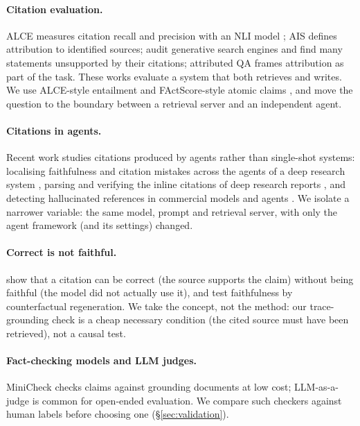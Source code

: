 \documentclass[11pt]{article}
\begin{document}
\paragraph{Citation evaluation.} ALCE \citep{gao2023alce} measures citation recall and precision
with an NLI model \citep{honovich2022true}; AIS \citep{rashkin2023ais} defines attribution to
identified sources; \citet{liu2023verifiability} audit generative search engines and find many
statements unsupported by their citations; attributed QA \citep{bohnet2022attributed} frames
attribution as part of the task. These works evaluate a system that both retrieves and writes.
We use ALCE-style entailment and FActScore-style atomic claims \citep{min2023factscore}, and move
the question to the boundary between a retrieval server and an independent agent.

\paragraph{Citations in agents.} Recent work studies citations produced by agents rather than
single-shot systems: localising faithfulness and citation mistakes across the agents of a deep
research system \citep{hirsch2026blame}, parsing and verifying the inline citations of deep
research reports \citep{onweller2026cited}, and detecting hallucinated references in commercial
models and agents \citep{rao2026reference}. We isolate a narrower variable: the same model, prompt
and retrieval server, with only the agent framework (and its settings) changed.

\paragraph{Correct is not faithful.} \citet{wallat2025correctness} show that a citation can be
correct (the source supports the claim) without being faithful (the model did not actually use
it), and test faithfulness by counterfactual regeneration. We take the concept, not the method:
our trace-grounding check is a cheap necessary condition (the cited source must have been
retrieved), not a causal test.

\paragraph{Fact-checking models and LLM judges.} MiniCheck \citep{tang2024minicheck} checks claims
against grounding documents at low cost; LLM-as-a-judge \citep{zheng2023judging} is common for
open-ended evaluation. We compare such checkers against human labels before choosing one
(\S\ref{sec:validation}).
\end{document}

